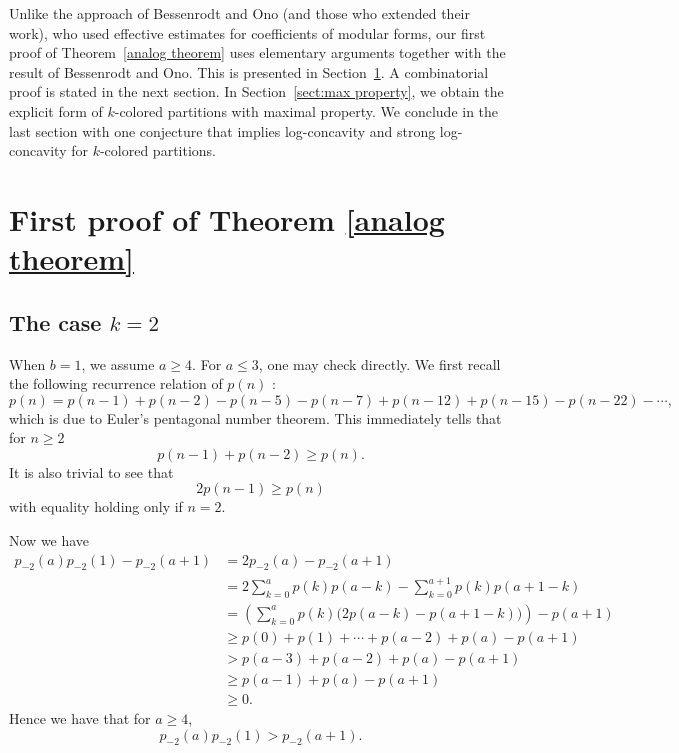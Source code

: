 \documentclass[12pt,reqno]{amsart}
\numberwithin{equation}{section}
\theoremstyle{plain}
\theoremstyle{definition}
\begin{document}
Unlike the approach of Bessenrodt and Ono (and those who extended their work), who used effective estimates for coefficients of modular forms, our first proof of Theorem~\ref{analog theorem} uses elementary arguments together with the result of Bessenrodt and Ono. This is presented in Section~\ref{sect:1st proof}. A combinatorial proof is stated in the next section. In Section~\ref{sect:max property}, we obtain the explicit form of $k$-colored partitions with maximal property. We conclude in the last section with one conjecture that implies log-concavity and strong log-concavity for $k$-colored partitions.


\section{First proof of Theorem \ref{analog theorem}}\label{sect:1st proof}

\subsection{The case $k=2$}



When $b=1$, we assume $a\ge 4$. For $a\le 3$, one may check directly. We first recall the following recurrence relation of $p(n)$ \cite[p. 12, Corollary 1.8]{Andr1976}:
$$p(n)=p(n-1)+p(n-2)-p(n-5)-p(n-7)+p(n-12)+p(n-15)-p(n-22)-\cdots,$$
which is due to Euler's pentagonal number theorem. This immediately tells that for $n\ge 2$
$$p(n-1)+p(n-2)\ge p(n).$$
It is also trivial to see that
$$2p(n-1)\ge p(n)$$
with equality holding only if $n=2$.

Now we have
\begin{align*}
p_{-2}(a)p_{-2}(1)-p_{-2}(a+1)&=2p_{-2}(a)-p_{-2}(a+1)\\
&=2\sum_{k=0}^a p(k)p(a-k)-\sum_{k=0}^{a+1}p(k)p(a+1-k)\\
&=\left(\sum_{k=0}^a p(k)\big(2p(a-k)-p(a+1-k)\big)\right)-p(a+1)\\
&\ge p(0)+p(1)+\cdots+p(a-2)+p(a)-p(a+1)\\
&> p(a-3)+p(a-2)+p(a)-p(a+1)\\
&\ge p(a-1)+p(a)-p(a+1)\\
&\ge 0.
\end{align*}
Hence we have that for $a\ge 4$,
$$p_{-2}(a)p_{-2}(1)>p_{-2}(a+1).$$
\end{document}

